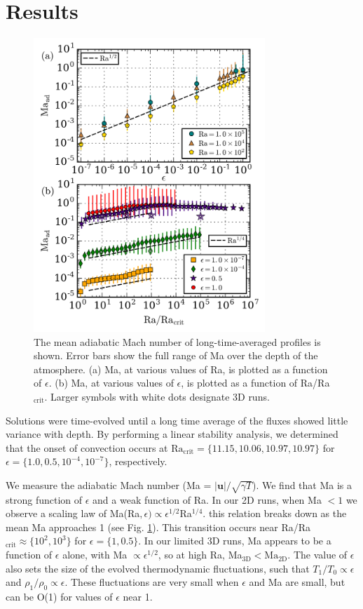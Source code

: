 \documentclass[aps, prl, twocolumn, nofootinbib, groupedaddress, amsfonts, amssymb, amsmath]{revtex4-1}
\begin{document}
\section{Results}
\label{sec:results}


\begin{figure}[t]
\includegraphics[width=3.4375in]{./figs/ma_v_Ra.png}
\caption{The mean adiabatic Mach number of long-time-averaged profiles
is shown.  Error bars show the full range of Ma over the depth of the
atmosphere.
(a) Ma, at various values of Ra, 
is plotted as a function of $\epsilon$.
(b) Ma, at various values of $\epsilon$, 
is plotted as a function of Ra/Ra$_{\text{crit}}$.
Larger symbols with white dots designate 3D runs.
\label{fig:ma_v_eps} }
\end{figure}


Solutions were time-evolved until a long time average of the fluxes
showed little
variance with depth. By performing a linear stability analysis, 
we determined that the onset of convection
occurs at $\text{Ra}_{\text{crit}} = \{11.15, 10.06, 10.97, 10.97\}$ 
for $\epsilon = \{1.0, 0.5, 10^{-4}, 10^{-7}\}$, respectively.  

We measure the adiabatic Mach number (Ma = $|\bm{u}|/\sqrt{\gamma T}$).
We find that Ma is a strong function of 
$\epsilon$ and a weak function of Ra.  
In our 2D runs, when Ma $< 1$ we observe a scaling law of
Ma(Ra$, \epsilon) \propto \epsilon^{1/2}$Ra$^{1/4}$.
this relation breaks down as the mean
Ma approaches 1 (see Fig. \ref{fig:ma_v_eps}).  This transition
occurs near Ra/Ra$_\text{crit} \approx \{10^{2}, 10^{3}\}$ for $\epsilon = \{1, 0.5\}$.
In our limited 3D runs, Ma appears to be a function of $\epsilon$ alone, with
Ma $\propto \epsilon^{1/2}$, so at high Ra, Ma$_{\text{3D}} < \text{Ma}_{\text{2D}}$.
The value of $\epsilon$ also sets the size of the
evolved thermodynamic fluctuations, such that
$T_1/T_0 \propto \epsilon$ and $\rho_1/\rho_0 \propto \epsilon$.  
These fluctuations are very small when $\epsilon$ and Ma are small,
but can be O(1) for values of $\epsilon$ near 1.
\end{document}

